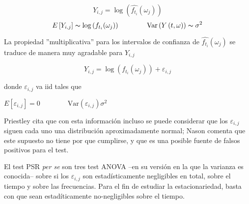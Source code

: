 $$Y_{i,j} = \log \left( \widehat{f_{t_i}}(\omega_j) \right)$$
\begin{equation*}
E\left[ Y_{i,j} \right] \thicksim \log \left( f_{t_i}(\omega_j) \right)
\hspace{4em}
\text{Var}\left( {Y\left(t,\omega\right)}\right) \thicksim \sigma^{2}
\end{equation*}

La propiedad ''multiplicativa'' para los intervalos de confianza de $\widehat{f_{t_i}}(\omega_j)$
se traduce de manera muy agradable para $Y_{i,j}$

$$Y_{i,j} = \log \left( f_{t_i}(\omega_j) \right) + \varepsilon_{i,j}$$

donde $\varepsilon_{i,j}$ va iid tales que

$
E\left[ \varepsilon_{i,j} \right] = 0
\hspace{4em}
\text{Var}\left( \varepsilon_{i,j} \right) \sigma^{2}
$

Priestley cita que con esta informaci\'on incluso se puede considerar que los $\varepsilon_{i,j}$
siguen cada uno una distribuci\'on aproximadamente normal; Nason %
comenta que
este supuesto no tiene por que cumplirse, y que es una posible fuente de falsos positivos
para el test. 

El test PSR \textit{per se} son tres test ANOVA --en su versi\'on en la que la varianza es conocida--
sobre si los $\varepsilon_{i,j}$ son estad\'isticamente negligibles en total, sobre el tiempo y sobre
las frecuencias. Para el fin de estudiar la estacionariedad, basta con que sean estad\'iticamente
no-negligibles sobre el tiempo.



